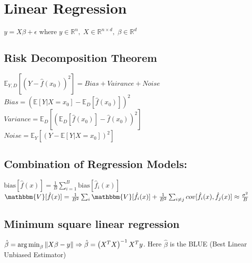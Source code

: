 
\section{Linear Regression}
\(y = X\beta + \epsilon\) where \(y \in \mathbb{R}^n, \;X \in \mathbb{R}^{n\times d},\;\beta \in \mathbb{R}^d\)

\subsection*{Risk Decomposition Theorem}
\(\mathbb{E}_{Y,D}\left[ \left( Y-\hat{f}(x_0)\right) ^2 \right] = Bias + Vairance + Noise\)\\
\(Bias =\left(\mathbb{E}\left[Y\vert X=x_0\right]-\mathbb{E}_{D}\left[\hat{f}(x_0)\right]\right)^2\)\\
\(Variance =  \mathbb{E}_{D}\left[ \left( \mathbb{E}_{D}\left[\hat{f}(x_0)\right]- \hat{f}(x_0)\right) ^2 \right]\)\\
\(Noise =  \mathbb{E}_{Y}\left[\left(Y-\mathbb{E}\left[Y\vert X=x_0\right]\right)^2\right] \)
\subsection*{Combination of Regression Models:}
$\text{bias}[\hat{f}(x)] = \frac{1}{B} \sum_{i=1}^{B} \text{bias}[\hat{f}_i(x)]$\\
{\scriptsize $\mathbbm{V}[\hat{f}(x)] = \frac{1}{B^2}\sum_i \mathbbm{V}[\hat{f}_i(x)]
+ \frac{1}{B^2}\sum_{i\neq j} cov[\hat{f}_i(x), \hat{f}_j(x)] \approx \frac{\sigma^2}{B}$}
\subsection*{Minimum square linear regression}
\(\hat{\beta} = \operatorname*{arg\,min}_{\beta}{\left\lVert X\beta - y\right\rVert} \Rightarrow \hat{\beta} = \left(X^TX \right)^{-1}X^T y\). Here \(\hat{\beta}\) is the BLUE (Best Linear Unbiased Estimator)

